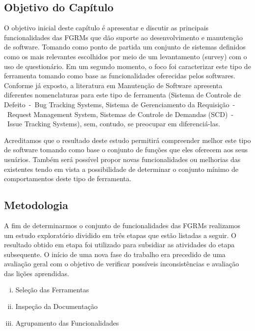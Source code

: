 \todoend{}

\subsection{Objetivo do Capítulo}
\label{subsec:caracterizacao_objetivo_do_capitulo}

O objetivo inicial deste capítulo é apresentar e discutir as principais
funcionalidades das FGRMs que dão suporte ao desenvolvimento e manutenção de
software. Tomando como ponto de partida um conjunto de sistemas definidos como
os mais relevantes escolhidos por meio de um levantamento (survey) com o uso de
questionário. Em um segundo momento, o foco foi caracterizar este tipo de
ferramenta tomando como base as funcionalidades oferecidas pelos softwares.
Conforme já exposto, a literatura em Manutenção de Software apresenta diferentes
nomenclaturas para este tipo de ferramenta (Sistema de Controle de Defeito~-~Bug
Tracking Systems, Sistema de Gerenciamento da Requisição~-~Request Management
System, Sistemas de Controle de Demandas (SCD)~-~Issue Tracking Systems), sem,
contudo, se preocupar em diferenciá-las.

Acreditamos que o resultado deste estudo permitirá compreender melhor este tipo
de software tomando como base o conjunto de funções que eles oferecem aos seus
usuários. Também será possível propor novas funcionalidades ou melhorias das
existentes tendo em vista a possibilidade de determinar o conjunto mínimo de
comportamentos deste tipo de ferramenta.

\subsection{Metodologia}
\label{subsec:metodologia}

A fim de determinarmos o conjunto de funcionalidades das FGRMs realizamos um
estudo exploratório dividido em três etapas que estão listadas a seguir. O
resultado obtido em etapa foi utilizado para subsidiar as atividades do etapa
subsequente. O início de uma nova fase do trabalho era precedido de uma
avaliação geral com o objetivo de verificar possíveis inconsistências e
avaliação das lições aprendidas.

\begin{enumerate}[(i)]
	\item Seleção das Ferramentas
	\item Inspeção da Documentação
	\item Agrupamento das Funcionalidades
\end{enumerate}

